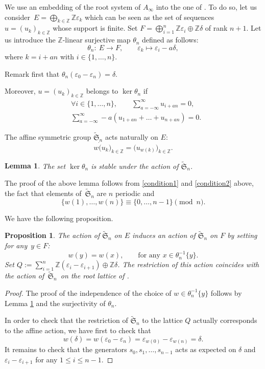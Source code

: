 \documentclass[pdftex]{sigma}
\newtheorem{Lemma}[Theorem]{Lemma}
\newtheorem{Proposition}[Theorem]{Proposition}
 { \theoremstyle{definition}
\newtheorem{Definition}[Theorem]{Definition}
\newtheorem{Note}[Theorem]{Note}
\newtheorem{Example}[Theorem]{Example}
\newtheorem{Remark}[Theorem]{Remark} }
\numberwithin{equation}{section}
\newcommand{\Z}{\mathbb{Z}}
\begin{document}
We use an embedding of the root system of $A_\infty$ into the one of . To do so, let us consider~${E=\bigoplus_{k\in\Z} \Z\varepsilon_k}$ which can be seen as the set of sequences $u=(u_k)_{k\in\Z}$ whose support is finite. Set $F=\bigoplus_{i=1}^n \Z\varepsilon_i\oplus \Z\delta$ of rank $n+1$. Let us introduce the $\Z$-linear surjective map $\theta_n$ defined as follows:
\[
\theta_n\colon \ E   \to   F,\qquad
\varepsilon_k  \mapsto  \varepsilon_i-a\delta ,
\]
where $k=i+an$ with $i\in\lbrace 1,\dots,n\rbrace$.

Remark first that $\theta_n(\varepsilon_0-\varepsilon_n)=\delta$.

Moreover, $u=(u_k)_{k\in\Z}$ belongs to $\ker \theta_n$ if
\begin{align}
&\forall i\in\lbrace 1,\dots,n\rbrace,\qquad\sum_{a=-\infty}^{\infty} u_{i+an}=0,\label{condition1}\\
&\sum_{a=-\infty}^{\infty} -a(u_{1+an}+\dots+u_{n+an})=0.\label{condition2}
\end{align}

The affine symmetric group $\widetilde{\mathfrak{S}}_{n}$ acts naturally on $E$:
\[w\dot (u_k)_{k\in\Z}=\bigl(u_{w(k)}\bigr)_{k\in\Z}.\]
\begin{Lemma}\label{lem:stability}
The set $\ker \theta_n$ is stable under the action of $\widetilde{\mathfrak{S}}_{n}$.
\end{Lemma}
The proof of the above lemma follows from \eqref{condition1} and \eqref{condition2} above, the fact that elements of~$\widetilde{\mathfrak{S}}_{n}$ are $n$ periodic and
\[\lbrace w(1),\dots ,w(n)\rbrace\equiv\lbrace 0,\dots,n-1\rbrace\pmod{n}.\]


We have the following proposition.

\begin{Proposition}%
The action of $\widetilde{\mathfrak{S}}_{n}$ on $E$ induces an action of $\widetilde{\mathfrak{S}}_{n}$ on $F$ by setting for any~$y\in F$:
\[w(y)=w(x), \qquad\text{for any } x\in \theta_n^{-1}\lbrace y\rbrace.\]
Set $Q:=\sum_{i=1}^{n}\Z(\varepsilon_i-\varepsilon_{i+1})\oplus\Z\delta$. The restriction of this action coincides with the action of~$\widetilde{\mathfrak{S}}_{n}$~on the root lattice of .
\end{Proposition}
\begin{proof}
The proof of the independence of the choice of $w\in\theta_n^{-1}\lbrace y\rbrace$ follows by Lemma \ref{lem:stability} and the surjectivity of $\theta_n$.

In order to check that the restriction of $\widetilde{\mathfrak{S}}_{n}$ to the lattice $Q$ actually corresponds to the affine action, we have first to check that
\[ w(\delta)=w(\varepsilon_0-\varepsilon_n)=\varepsilon_{w(0)}-\varepsilon_{w(n)}=\delta.\]
It remains to check that the generators $s_0,s_1,\dots,s_{n-1}$ acts as expected on $\delta$ and $\varepsilon_i-\varepsilon_{i+1}$ for any $1\leq i\leq n-1$.
\end{proof}
\end{document}

